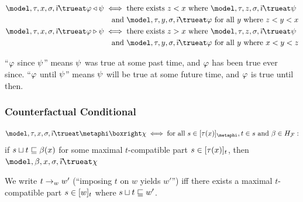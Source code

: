 \documentclass[../LogosReference.tex]{subfiles}
\begin{document}
\begin{definition}\label{def:since-until-truth}
	\begin{align}
		\model, \history, x, \assignment, \tempindex \trueat \metaA \since \metaB & \iff \text{there exists } z < x \text{ where } \model, \history, z, \assignment, \tempindex \trueat \metaB \notag         \\
		                                                                          & \quad \text{and } \model, \history, y, \assignment, \tempindex \trueat \metaA \text{ for all } y \text{ where } z < y < x \\
		\model, \history, x, \assignment, \tempindex \trueat \metaA \until \metaB & \iff \text{there exists } z > x \text{ where } \model, \history, z, \assignment, \tempindex \trueat \metaB \notag         \\
		                                                                          & \quad \text{and } \model, \history, y, \assignment, \tempindex \trueat \metaA \text{ for all } y \text{ where } x < y < z
	\end{align}
\end{definition}

\begin{remark}
	``$\varphi$ since $\psi$'' means $\psi$ was true at some past time, and $\varphi$ has been true ever since.
	``$\varphi$ until $\psi$'' means $\psi$ will be true at some future time, and $\varphi$ is true until then.
\end{remark}

\subsubsection{Counterfactual Conditional}

\begin{definition}\label{def:counterfactual-truth}
	\[
		\model, \history, x, \assignment, \tempindex \trueat \metaphi \boxright \metaC \iff \text{for all } s \in \maxcompat{\history(x)}{\metaphi}, t \in s \text{ and } \beta \in \historyspace:
	\]
	if $s\sqcup t \sqsubseteq \beta(x)$ for some maximal $t$-compatible part $s \in [\tau(x)]_{t}$, then $\model, \beta, x, \assignment, \tempindex \trueat \metaC$
\end{definition}

\begin{definition}[Imposition]\label{def:imposition}
	We write $t \to_{w}{w'}$ (``imposing $t$ on $w$ yields $w'$'') iff there exists a maximal $t$-compatible part $s \in [w]_{t}$ where $s\sqcup t \sqsubseteq w'$.
\end{definition}
\end{document}

